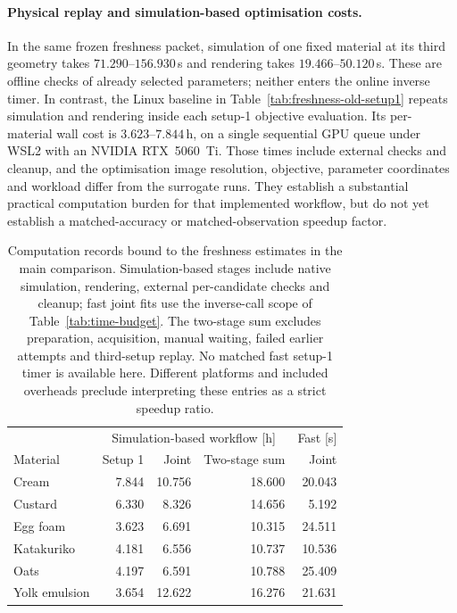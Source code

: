 \paragraph{Physical replay and simulation-based optimisation costs.}
In the same frozen freshness packet, simulation of one fixed material
at its third geometry takes $71.290$--$156.930$\,s and rendering takes
$19.466$--$50.120$\,s. These are offline checks of already selected
parameters; neither enters the online inverse timer. In contrast, the
Linux baseline in Table~\ref{tab:freshness-old-setup1} repeats simulation
and rendering inside each setup-1 objective evaluation. Its per-material
wall cost is $3.623$--$7.844$\,h, on a single sequential GPU queue under
WSL2 with an NVIDIA RTX~5060~Ti. Those times include external checks
and cleanup, and the optimisation image resolution, objective, parameter
coordinates and workload differ from the surrogate runs. They establish
a substantial practical computation burden for that implemented
workflow, but do not yet establish a matched-accuracy or
matched-observation speedup factor.

\begin{table}[!htbp]
\centering\small
\setlength{\tabcolsep}{7pt}
\caption{Computation records bound to the freshness estimates in the
main comparison. Simulation-based stages include native simulation,
rendering, external per-candidate checks and cleanup; fast joint fits
use the inverse-call scope of Table~\ref{tab:time-budget}.
The two-stage sum excludes preparation, acquisition, manual waiting,
failed earlier attempts and third-setup replay. No matched fast
setup-1 timer is available here. Different platforms and included
overheads preclude interpreting these entries as a strict speedup ratio.}
\label{tab:fresh-workflow-time}
\begin{tabular}{@{}lrrrr@{}}
\toprule
 & \multicolumn{3}{c}{Simulation-based workflow [h]} & Fast [s] \\
Material & Setup 1 & Joint & Two-stage sum & Joint \\
\midrule
Cream & 7.844 & 10.756 & 18.600 & 20.043 \\
Custard & 6.330 & 8.326 & 14.656 & 5.192 \\
Egg foam & 3.623 & 6.691 & 10.315 & 24.511 \\
Katakuriko & 4.181 & 6.556 & 10.737 & 10.536 \\
Oats & 4.197 & 6.591 & 10.788 & 25.409 \\
Yolk emulsion & 3.654 & 12.622 & 16.276 & 21.631 \\
\bottomrule
\end{tabular}
\end{table}

